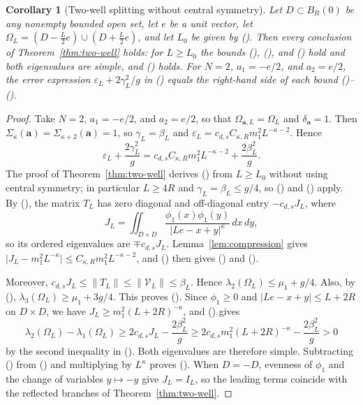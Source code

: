 \documentclass[twoside,10pt]{article}
\numberwithin{equation}{section}
\theoremstyle{slbody}
\newtheorem{corollary}[theorem]{Corollary}
\theoremstyle{definition}
\newcommand{\norm}[1]{\lVert #1\rVert}
\newcommand{\abs}[1]{\lvert #1\rvert}
\renewcommand{\eqref}[1]{%
  \textup{{\normalfont(\oldstylenums{\ref{#1}}}\normalfont)}}
\begin{document}
\begin{corollary}[Two-well splitting without central symmetry]
\label{cor:multi-two}
Let $D\subset B_R(0)$ be any nonempty bounded open set, let $e$ be a unit vector,
let $\Omega_L=(D-\frac L2e)\cup(D+\frac L2e)$, and let $L_0$ be given by
\eqref{eq:explicit-L0}.  Then every conclusion of
Theorem~\ref{thm:two-well} holds: for $L\geq L_0$ the bounds
\eqref{eq:lambda1}, \eqref{eq:lambda2}, and \eqref{eq:two-well-third-level}
hold and both eigenvalues are simple, and \eqref{eq:gap-limit} holds.  For
$N=2$, $a_1=-e/2$, and $a_2=e/2$, the error expression
$\varepsilon_L+2\gamma_L^2/g$ in \eqref{eq:multi-eigenvalue-bound} equals
the right-hand side of each bound \eqref{eq:lambda1}--\eqref{eq:lambda2}.
\end{corollary}

\begin{proof}
Take $N=2$, $a_1=-e/2$, and $a_2=e/2$, so that $\Omega_{\mathbf a,L}=\Omega_L$
and $\delta_{\mathbf a}=1$.  Then
$\Sigma_\kappa(\mathbf a)=\Sigma_{\kappa+2}(\mathbf a)=1$, so
$\gamma_L=\beta_L$ and
$\varepsilon_L=c_{d,s}C_{\kappa,R}m_1^2L^{-\kappa-2}$.  Hence
\[
 \varepsilon_L+\frac{2\gamma_L^2}{g}
 =c_{d,s}C_{\kappa,R}m_1^2L^{-\kappa-2}
  +\frac{2\beta_L^2}{g}.
\]
The proof of Theorem~\ref{thm:two-well} derives \eqref{eq:L0-conditions}
from $L\geq L_0$ without using central symmetry; in particular $L\geq4R$ and
$\gamma_L=\beta_L\leq g/4$, so \eqref{eq:exact-cluster-comparison} and
\eqref{eq:cluster-separation} apply.  By \eqref{eq:exact-compression}, the
matrix $T_L$ has zero diagonal and off-diagonal entry $-c_{d,s}J_L$, where
\[
 J_L=\iint_{D\times D}
 \frac{\phi_1(x)\phi_1(y)}{\abs{Le-x+y}^{\kappa}}\,dx\,dy,
\]
so its ordered eigenvalues are $\mp c_{d,s}J_L$.  Lemma~\ref{lem:compression}
gives $\abs{J_L-m_1^2L^{-\kappa}}\leq C_{\kappa,R}m_1^2L^{-\kappa-2}$, and
\eqref{eq:exact-cluster-comparison} then gives
\eqref{eq:lambda1} and \eqref{eq:lambda2}.

Moreover, $c_{d,s}J_L\leq\norm{T_L}\leq\norm{\mathcal V_L}\leq\beta_L$.
Hence $\lambda_2(\Omega_L)\leq\mu_1+g/4$.  Also, by
\eqref{eq:cluster-separation}, $\lambda_3(\Omega_L)\geq\mu_1+3g/4$.  This
proves \eqref{eq:two-well-third-level}.  Since $\phi_1\geq0$ and
$\abs{Le-x+y}\leq L+2R$ on $D\times D$, we have
$J_L\geq m_1^2(L+2R)^{-\kappa}$, and \eqref{eq:exact-cluster-comparison}
gives
\[
 \lambda_2(\Omega_L)-\lambda_1(\Omega_L)
 \geq2c_{d,s}J_L-\frac{2\beta_L^2}{g}
 \geq2c_{d,s}m_1^2(L+2R)^{-\kappa}-\frac{2\beta_L^2}{g}>0
\]
by the second inequality in \eqref{eq:L0-conditions}.  Both eigenvalues are
therefore simple.  Subtracting \eqref{eq:lambda1} from \eqref{eq:lambda2} and
multiplying by $L^\kappa$ proves \eqref{eq:gap-limit}.  When $D=-D$, evenness
of $\phi_1$ and the change of variables $y\mapsto-y$ give $J_L=I_L$, so the
leading terms coincide with the reflected branches of
Theorem~\ref{thm:two-well}.
\end{proof}
\end{document}
